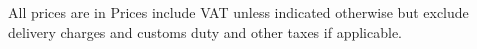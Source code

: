 
		
		\subsection{} All prices are in \currency  Prices include VAT unless indicated otherwise but exclude delivery charges and customs duty and other taxes if applicable. 
